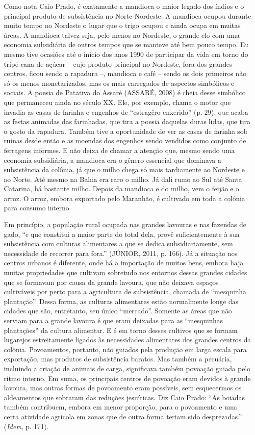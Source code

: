Como nota Caio Prado, é exatamente a mandioca o maior legado dos índios
e o principal produto de subsistência no Norte-Nordeste. A mandioca
ocupou durante muito tempo no Nordeste o lugar que o trigo ocupou e
ainda ocupa em muitas áreas. A mandioca talvez seja, pelo menos no
Nordeste, o grande elo com uma economia subsidiária de outros tempos que
se manteve até bem pouco tempo. Eu mesmo tive ocasiões até o início dos
anos 1990 de participar da vida em torno do tripé cana-de-açúcar -- cujo
produto principal no Nordeste, fora dos grandes centros, ficou sendo a
rapadura --, mandioca e café -- sendo os dois primeiros não só os menos
monetarizados, mas os mais carregados de aspectos simbólicos e sociais.
A poesia de Patativa do Assaré (ASSARÉ, 2008) é cheia desse simbólico
que permaneceu ainda no século XX. Ele, por exemplo, chama o motor que
invadia as casas de farinha e engenhos de ``estragêro enxerido'' (p.
29), que acaba as festas animadas das farinhadas, que tira a poesia
daquelas duras lidas, que tira o gosto da rapadura. Também tive a
oportunidade de ver as casas de farinha sob ruínas desde então e as
moendas dos engenhos sendo vendidos como conjunto de ferragens informes.
E não deixa de chamar a atenção que, mesmo sendo uma economia
subsidiária, a mandioca era o gênero essencial que dominava a
subsistência da colônia, já que o milho chega só mais tardiamente ao
Nordeste e ao Norte. Até mesmo na Bahia era raro o milho. Já dali rumo
ao Sul até Santa Catarina, há bastante milho. Depois da mandioca e do
milho, vem o feijão e o arroz. O arroz, embora exportado pelo Maranhão,
é cultivado em toda a colônia para consumo interno.

Em princípio, a população rural ocupada nas grandes lavouras e nas
fazendas de gado, ``e que constitui a maior parte do total dela, provê
suficientemente à sua subsistência com culturas alimentares a que se
dedica subsidiariamente, sem necessidade de recorrer para fora.''
(JÚNIOR, 2011, p. 166). Já a situação nos centros urbanos é diferente,
onde há a importação de muitos bens, embora haja muitas propriedades que
cultivam sobretudo nos entornos dessas grandes cidades que se formavam
por causa da grande lavoura, que não deixava espaços cultiváveis por
perto para a agricultura de subsistência, chamada de ``mesquinha
plantação''. Dessa forma, as culturas alimentares estão normalmente
longe das cidades que são, entretanto, seu único ``mercado''. Somente as
áreas que não serviam para a grande lavoura é que eram deixadas para as
``mesquinhas plantações'' da cultura alimentar. E é em torno desses
cultivos que se formam lugarejos estreitamente ligados às necessidades
alimentares dos grandes centros da colônia. Povoamentos, portanto, não
guiados pela produção em larga escala para exportação, mas produtos de
subsistência baratos. Mas também a pecuária, incluindo a criação de
animais de carga, significava também povoação guiada pelo ritmo interno.
Em suma, os principais centros de povoação eram devidos à grande
lavoura, mas outras formas de povoamento eram possíveis, sem esquecermos
os aldeamentos que sobraram das reduções jesuíticas. Diz Caio Prado:
``As boiadas também contribuem, embora em menor proporção, para o
povoamento e uma certa atividade agrícola em zonas que de outra forma
teriam sido desprezadas.'' (\emph{Idem}, p. 171).

